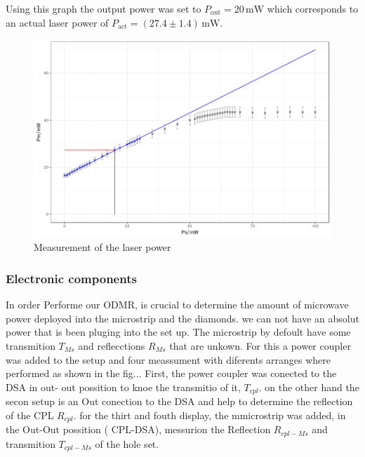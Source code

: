 Using this graph the output power was set to $P_\text{out}=20\,\mathrm{mW}$ which corresponds to an actual laser power of $P_\text{act}=(27.4\pm1.4)\,\mathrm{mW}$.
\begin{figure}[hb]
	\centering
	\includegraphics[width=\textwidth]{../figures/powercal.png}
	\caption{Measurement of the laser power}
	\label{fig:power}
\end{figure}


\subsubsection{Electronic components}

In order Performe our ODMR, is crucial to determine the amount of microwave power deployed into the microstrip and the diamonds. we can not have an absolut power that is been pluging into the set up. The microstrip by defoult have some transmition $T_{Ms}$ and reflecctions $R_{Ms}$ that are unkown.
For this a power coupler was added to the setup and four meassument with diferents arranges where performed as shown in the fig...
First, the power coupler was conected to the DSA in out- out possition to knoe the transmitio of it, $T_{cpl}$. on the other hand the secon setup is an Out conection to the DSA and help to determine the reflection of the CPL $R_{cpl}$. for the thirt and fouth display, the mmicrostrip was added, in the Out-Out possition ( CPL-DSA), messurion the Reflection $R_{cpl-Ms}$ and transmition $T_{cpl-Ms}$ of the hole set.

